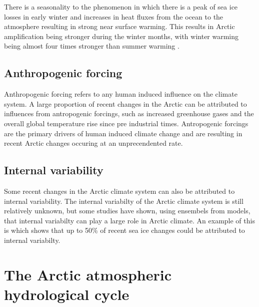 \documentclass[12pt, oneside]{article}
\begin{document}
There is a seasonality to the phenomenon in which there is a peak of sea ice losses in early winter and increases in heat fluxes from the ocean to the atmosphere resulting in strong near surface warming. This results in Arctic amplification being stronger during the winter months, with winter warming being almost four times stronger than summer warming \cite{bintanja2013changing}. 


\subsection{Anthropogenic forcing}
Anthropogenic forcing refers to any human induced influence on the climate system. A large proportion of recent changes in the Arctic can be attributed to influences from antropogenic forcings, such as increased greenhouse gases and the overall global temperature rise since pre industrial times. Antropogenic forcings are the primary drivers of human induced climate change and are resulting in recent Arctic changes occuring at an unprecendented rate. 


\subsection{Internal variability}
Some recent changes in the Arctic climate system can also be attributed to internal variability. The internal variabilty of the Arctic climate system is still relatively unknown, but some studies have shown, using ensembels from models, that internal variabilty can play a large role in Arctic climate. An example of this is \cite{ding2019fingerprints} which shows that up to 50\% of recent sea ice changes could be attributed to internal variabilty. 


\section{The Arctic atmospheric hydrological cycle}



\end{document}
